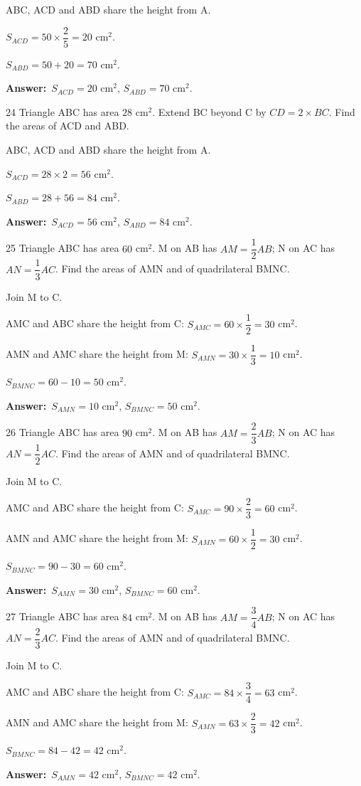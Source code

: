 \documentclass[11pt]{article}
\newif\ifsol \solfalse
\providecommand{\AnsWord}{Đáp số}
\newcommand{\dapso}[1]{\par\textbf{\AnsWord:}\ #1}
\newcommand{\probsol}[1]{%
  \begin{lrbox}{\solmeasure}\begin{minipage}{\dimexpr\linewidth-24pt\relax}#1\end{minipage}\end{lrbox}%
  \ifsol
    \begin{solbox}#1\end{solbox}%
  \else
    \setlength{\solht}{\dimexpr\ht\solmeasure+\dp\solmeasure+0.85cm\relax}%
    \ifdim\solht<1.35cm\setlength{\solht}{1.35cm}\fi
    \begin{tcolorbox}[colback=white,colframe=Line,boxrule=0.8pt,arc=5pt,
      left=8pt,right=8pt,top=4pt,bottom=4pt,height=\solht]{\footnotesize\color{Slate}\itshape\WorkWord}\end{tcolorbox}%
  \fi}
\newcommand{\gap}{\vspace{0.3cm}}
\def\WorkWord{Your work:}
\def\AnsWord{Answer}
\begin{document}
\probsol{
ABC, ACD and ABD share the height from A.\par $S_{ACD}=50\times\dfrac{2}{5}=20$ cm$^2$.\par $S_{ABD}=50+20=70$ cm$^2$.
\dapso{$S_{ACD}=20$ cm$^2$, $S_{ABD}=70$ cm$^2$.}}
\gap
\begin{probbox}{24}{\relax}
Triangle ABC has area $28$ cm$^2$. Extend BC beyond C by $CD=2\times BC$. Find the areas of ACD and ABD.
\end{probbox}
\probsol{
ABC, ACD and ABD share the height from A.\par $S_{ACD}=28\times2=56$ cm$^2$.\par $S_{ABD}=28+56=84$ cm$^2$.
\dapso{$S_{ACD}=56$ cm$^2$, $S_{ABD}=84$ cm$^2$.}}
\gap
\begin{probbox}{25}{\relax}
Triangle ABC has area $60$ cm$^2$. M on AB has $AM=\dfrac{1}{2}AB$; N on AC has $AN=\dfrac{1}{3}AC$. Find the areas of AMN and of quadrilateral BMNC.
\end{probbox}
\probsol{
Join M to C.\par AMC and ABC share the height from C: $S_{AMC}=60\times\dfrac{1}{2}=30$ cm$^2$.\par AMN and AMC share the height from M: $S_{AMN}=30\times\dfrac{1}{3}=10$ cm$^2$.\par $S_{BMNC}=60-10=50$ cm$^2$.
\dapso{$S_{AMN}=10$ cm$^2$, $S_{BMNC}=50$ cm$^2$.}}
\gap
\begin{probbox}{26}{\relax}
Triangle ABC has area $90$ cm$^2$. M on AB has $AM=\dfrac{2}{3}AB$; N on AC has $AN=\dfrac{1}{2}AC$. Find the areas of AMN and of quadrilateral BMNC.
\end{probbox}
\probsol{
Join M to C.\par AMC and ABC share the height from C: $S_{AMC}=90\times\dfrac{2}{3}=60$ cm$^2$.\par AMN and AMC share the height from M: $S_{AMN}=60\times\dfrac{1}{2}=30$ cm$^2$.\par $S_{BMNC}=90-30=60$ cm$^2$.
\dapso{$S_{AMN}=30$ cm$^2$, $S_{BMNC}=60$ cm$^2$.}}
\gap
\begin{probbox}{27}{\relax}
Triangle ABC has area $84$ cm$^2$. M on AB has $AM=\dfrac{3}{4}AB$; N on AC has $AN=\dfrac{2}{3}AC$. Find the areas of AMN and of quadrilateral BMNC.
\end{probbox}
\probsol{
Join M to C.\par AMC and ABC share the height from C: $S_{AMC}=84\times\dfrac{3}{4}=63$ cm$^2$.\par AMN and AMC share the height from M: $S_{AMN}=63\times\dfrac{2}{3}=42$ cm$^2$.\par $S_{BMNC}=84-42=42$ cm$^2$.
\dapso{$S_{AMN}=42$ cm$^2$, $S_{BMNC}=42$ cm$^2$.}}
\end{document}
